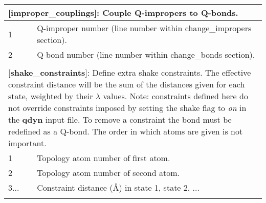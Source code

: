 \documentclass[a4paper,11pt]{article}
\begin{document}
\begin{longtable}{|p{53pt}|p{181pt}|p{160pt}|}
\multicolumn{3}{p{394pt}}{[\textbf{improper\_couplings}]: Couple Q-impropers to Q-bonds.}\\
\hline 1 & \multicolumn{2}{p{341pt}|}{Q-improper number (line number within change\_impropers section).}\\
\hline 2 & \multicolumn{2}{p{341pt}|}{Q-bond number (line number within change\_bonds section).}\\
\hline
\multicolumn{3}{p{394pt}}{}\\

\multicolumn{3}{p{394pt}}{[\textbf{shake\_constraints}]: Define extra shake constraints. The effective constraint distance will be the sum of the distances given for each state, weighted by their $\lambda$ values. Note: constraints defined here do not override constraints imposed by setting the shake flag to \emph{on} in the \textbf{qdyn} input file. To remove a constraint the bond must be redefined as a Q-bond. The order in which atoms are given is not important.}\\
\hline 1 & \multicolumn{2}{p{341pt}|}{Topology atom number of first atom.}\\
\hline 2 & \multicolumn{2}{p{341pt}|}{Topology atom number of second atom.}\\
\hline 3... & \multicolumn{2}{p{341pt}|}{Constraint distance ({\AA}) in state 1, state 2, ...}\\
\hline
\multicolumn{3}{p{394pt}}{}\\


\end{longtable}
\end{document}
